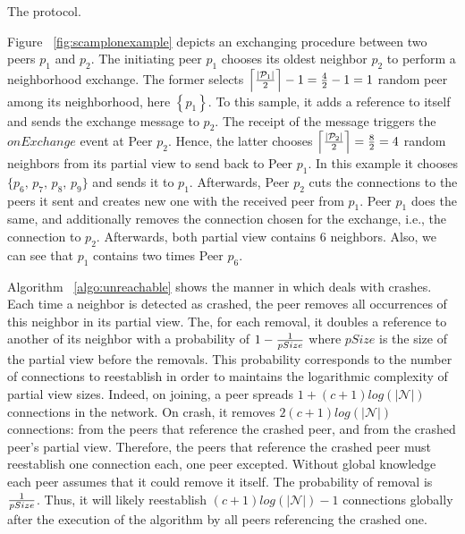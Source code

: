 \begin{algorithm}
  
  \caption{\label{algo:scamplon}The \SCAMPLON{} protocol.}
\end{algorithm}


\begin{asparadesc}
\item [Figure]~\ref{fig:scamplonexample} depicts an exchanging procedure
  between two peers $p_1$ and $p_2$. The initiating peer $p_1$ chooses its
  oldest neighbor $p_2$ to perform a neighborhood exchange. The former selects
  $\left\lceil{|\mathcal{P}_1|\over{2}}\right\rceil-1={4\over{2}}-1=1$ random
  peer among its neighborhood, here $\left\{p_1\right\}$. To this sample, it
  adds a reference to itself and sends the exchange message to $p_2$. The
  receipt of the message triggers the $onExchange$ event at Peer $p_2$. Hence,
  the latter chooses
  $\left\lceil{|\mathcal{P}_2|\over{2}}\right\rceil= {8\over{2}}=4$ random
  neighbors from its partial view to send back to Peer $p_1$. In this example
  it chooses $\{p_6,\,p_7,\,p_8,\,p_9\}$ and sends it to $p_1$. Afterwards,
  Peer $p_2$ cuts the connections to the peers it sent and creates new one with
  the received peer from $p_1$. Peer $p_1$ does the same, and additionally
  removes the connection chosen for the exchange, i.e., the connection to
  $p_2$. Afterwards, both partial view contains $6$ neighbors. Also, we can see
  that $p_1$ contains two times Peer $p_6$.
\end{asparadesc}



\begin{asparadesc}
\item [Algorithm]~\ref{algo:unreachable} shows the manner in which \SCAMPLON{}
  deals with crashes. Each time a neighbor is detected as crashed, the peer
  removes all occurrences of this neighbor in its partial view. The, for each
  removal, it doubles a reference to another of its neighbor with a probability
  of $1-{1\over{pSize}}$ where $pSize$ is the size of the partial view before
  the removals. This probability corresponds to the number of connections to
  reestablish in order to maintains the logarithmic complexity of partial view
  sizes. Indeed, on joining, a peer spreads $1+(c+1)log(|\mathcal{N}|)$
  connections in the network. On crash, it removes $2(c+1)log(|\mathcal{N}|)$
  connections: from the peers that reference the crashed peer, and from the
  crashed peer's partial view. Therefore, the peers that reference the crashed
  peer must reestablish one connection each, one peer excepted. Without global
  knowledge each peer assumes that it could remove it itself. The probability
  of removal is ${1\over{pSize}}$. Thus, it will likely reestablish
  $(c+1)log(|\mathcal{N}|)-1$ connections globally after the execution of the
  algorithm by all peers referencing the crashed one.
\end{asparadesc}

